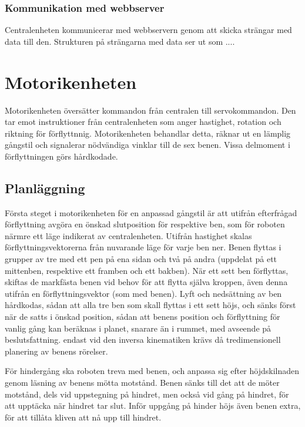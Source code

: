 \documentclass[a4paper,titlepage,12pt]{article}
\begin{document}
	\subsubsection{Kommunikation med webbserver}
	Centralenheten kommunicerar med webbservern genom att skicka strängar med data till den. Strukturen på strängarna med data ser ut som ....

	
	\section{Motorikenheten}
	Motorikenheten översätter kommandon från centralen till servokommandon. Den tar emot 
	instruktioner från centralenheten som anger hastighet, rotation och riktning för 
	förflyttnnig. Motorikenheten behandlar detta, räknar ut en lämplig gångstil och 
	signalerar nödvändiga vinklar till de sex benen. Vissa delmoment i förflyttningen 
	görs hårdkodade. 
	
	\subsection{Planläggning}
	Första steget i motorikenheten för en anpassad gångstil är att utifrån efterfrågad
	förflyttning avgöra en önskad slutposition för respektive ben, som för roboten närmre 
	ett läge indikerat av centralenheten. Utifrån hastighet skalas förflyttningsvektorerna 
	från nuvarande läge för varje ben ner. Benen flyttas i grupper av tre med ett pen på 
	ena sidan och två på  andra (uppdelat på ett mittenben, respektive ett framben och ett 
	bakben). När ett sett ben förflyttas, skiftas de markfästa benen vid behov för 
	att flytta själva kroppen, även denna utifrån en förflyttningsvektor (som med benen). 
	Lyft och nedsättning av ben hårdkodas, sådan att alla tre ben som skall flyttas i ett 
	sett höjs, och sänks först när de satts i önskad position, sådan att benens position 
	och förflyttning för vanlig gång kan beräknas i planet, snarare än i rummet, med 
	avseende på beslutsfattning. endast vid den inversa kinematiken krävs då 
	tredimensionell planering av benens rörelser. 

	För hindergång ska roboten treva med benen, och anpassa sig efter höjdskilnaden genom
	läsning av benens mötta motstånd. Benen sänks till det att de möter motstånd, dels
	vid uppstegning på hindret, men också vid gång på hindret, för att upptäcka när hindret 
	tar slut. Inför uppgång på hinder höjs även benen extra, för att tillåta kliven att nå 
	upp till hindret. 
	
\end{document}
